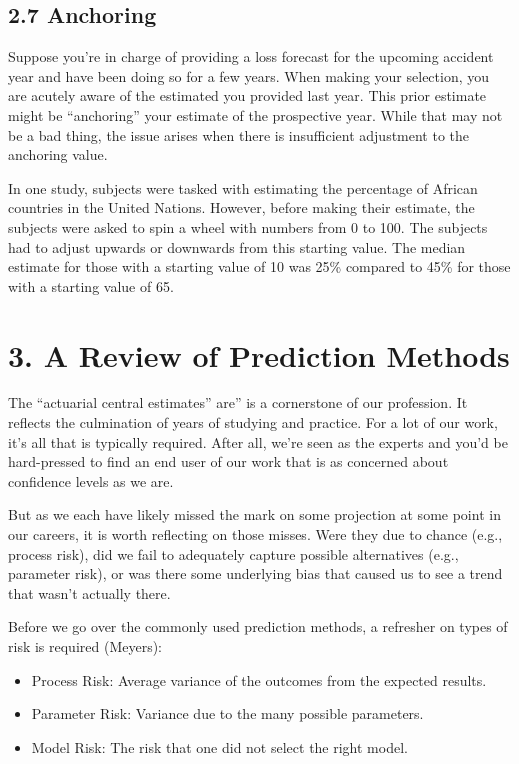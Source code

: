 \documentclass[
]{article}
\begin{document}
\hypertarget{anchoring}{%
\subsection{2.7 Anchoring}\label{anchoring}}

Suppose you're in charge of providing a loss forecast for the upcoming
accident year and have been doing so for a few years. When making your
selection, you are acutely aware of the estimated you provided last
year. This prior estimate might be ``anchoring'' your estimate of the
prospective year. While that may not be a bad thing, the issue arises
when there is insufficient adjustment to the anchoring value.

In one study, subjects were tasked with estimating the percentage of
African countries in the United Nations. However, before making their
estimate, the subjects were asked to spin a wheel with numbers from 0 to
100. The subjects had to adjust upwards or downwards from this starting
value. The median estimate for those with a starting value of 10 was
25\% compared to 45\% for those with a starting value of 65.

\hypertarget{a-review-of-prediction-methods}{%
\section{3. A Review of Prediction
Methods}\label{a-review-of-prediction-methods}}

The ``actuarial central estimates'' are'' is a cornerstone of our
profession. It reflects the culmination of years of studying and
practice. For a lot of our work, it's all that is typically required.
After all, we're seen as the experts and you'd be hard-pressed to find
an end user of our work that is as concerned about confidence levels as
we are.

But as we each have likely missed the mark on some projection at some
point in our careers, it is worth reflecting on those misses. Were they
due to chance (e.g., process risk), did we fail to adequately capture
possible alternatives (e.g., parameter risk), or was there some
underlying bias that caused us to see a trend that wasn't actually
there.

Before we go over the commonly used prediction methods, a refresher on
types of risk is required (Meyers):

\begin{itemize}
\item
  Process Risk: Average variance of the outcomes from the expected
  results.
\item
  Parameter Risk: Variance due to the many possible parameters.
\item
  Model Risk: The risk that one did not select the right model.
\end{itemize}
\end{document}
